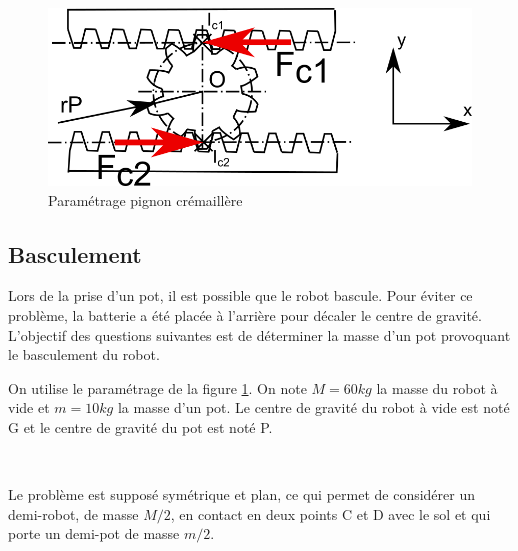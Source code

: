 \begin{figure}[ht!]
\begin{center}
 \includegraphics[width=0.6\linewidth]{img/fig14}
\end{center}
\caption{Paramétrage pignon crémaillère}
\label{fig14}
\end{figure}



\subsection{Basculement}

Lors de la prise d'un pot, il est possible que le robot bascule. Pour éviter ce problème, la batterie a été placée à l'arrière pour décaler le centre de gravité. L'objectif des questions suivantes est de déterminer la masse d'un pot provoquant le basculement du robot.


On utilise le paramétrage de la figure \ref{fig14}. On note $M=60kg$ la masse du robot à vide et $m=10kg$ la masse d'un pot. Le centre de gravité du robot à vide est noté G et le centre de gravité du pot est noté P.

~\

Le problème est supposé symétrique et plan, ce qui permet de considérer un demi-robot, de masse $M/2$, en contact en deux points C et D avec le sol et qui porte un demi-pot de masse $m/2$.

